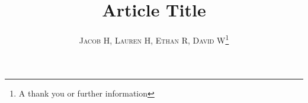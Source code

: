 \documentclass[twoside]{article}
\title{\vspace{-15mm}\fontsize{24pt}{10pt}\selectfont\textbf{Article Title}} %
\author{
\large
\textsc{Jacob H, Lauren H, Ethan R, David W}\thanks{A thank you or further information}\\[2mm] %
\vspace{-5mm}
}
\date{}
\begin{document}
\maketitle %

\thispagestyle{fancy} %


\begin{abstract}

\noindent \lipsum[1] %

\end{abstract}

\end{document}
